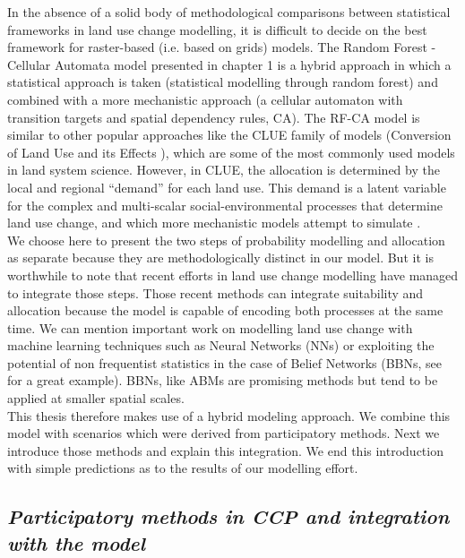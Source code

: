 \documentclass[12pt,Bold,TexShade]{thesis/mcgilletdclass}
\begin{document}
{In the absence of a solid body of methodological comparisons between statistical frameworks in land use change modelling, it is difficult to decide on the best framework for raster-based (i.e. based on grids) models. The Random Forest - Cellular Automata model presented in chapter 1 is a  hybrid approach in which a statistical approach is taken (statistical modelling through random forest) and combined with a more mechanistic approach (a cellular automaton with transition targets and spatial dependency rules, CA). The RF-CA model is similar to other popular approaches like the CLUE family of models (Conversion of Land Use and its Effects \cite{verburg_modeling_2002, verburg_combining_2009}), which are some of the most commonly used models in land system science. However, in CLUE, the allocation is determined by the local and regional “demand” for each land use. This demand is a latent variable for the complex and multi-scalar social-environmental processes that determine land use change, and which more mechanistic models attempt to simulate \citep{verburg_combining_2009}. \\

We choose here to present the two steps of probability modelling and allocation as separate because they are methodologically distinct in our model. But it is worthwhile to note that recent efforts in land use change modelling have managed to integrate those steps. Those recent methods can integrate suitability and allocation because the model is capable of encoding both processes at the same time. We can mention important work on modelling land use change with machine learning techniques such as Neural Networks (NNs) \citep{tayyebi_simulating_2013} or exploiting the potential of non frequentist statistics in the case of Belief Networks (BBNs, see \cite{celio_modeling_2014} for a great example). BBNs, like ABMs are promising methods but tend to be applied at smaller spatial scales. \\

This thesis therefore makes use of a hybrid modeling approach. We combine this model with scenarios which were derived from participatory methods. Next we introduce those methods and explain this integration. We end this introduction with simple predictions as to the results of our modelling effort. \\ \vspace{2em}

\subsection*{\textit{Participatory methods in CCP and integration with the model \\ \vspace{1em}}}

}
\end{document}
